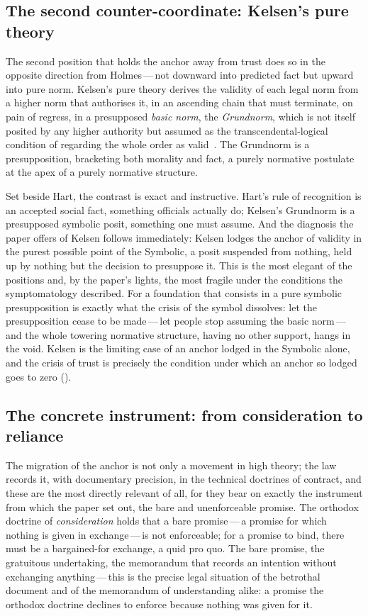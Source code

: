 \subsection{The second counter-coordinate: Kelsen's pure theory}
\label{p13:sub:jur-kelsen}

The second position that holds the anchor away from trust does so in the opposite direction from Holmes\,---\,not downward into predicted fact but upward into pure norm. Kelsen's pure theory derives the validity of each legal norm from a higher norm that authorises it, in an ascending chain that must terminate, on pain of regress, in a presupposed \emph{basic norm}, the \emph{Grundnorm}, which is not itself posited by any higher authority but assumed as the transcendental-logical condition of regarding the whole order as valid~\parencite{kelsen1967}. The Grundnorm is a presupposition, bracketing both morality and fact, a purely normative postulate at the apex of a purely normative structure.

Set beside Hart, the contrast is exact and instructive. Hart's rule of recognition is an accepted social fact, something officials actually do; Kelsen's Grundnorm is a presupposed symbolic posit, something one must assume. And the diagnosis the paper offers of Kelsen follows immediately: Kelsen lodges the anchor of validity in the purest possible point of the Symbolic, a posit suspended from nothing, held up by nothing but the decision to presuppose it. This is the most elegant of the positions and, by the paper's lights, the most fragile under the conditions the symptomatology described. For a foundation that consists in a pure symbolic presupposition is exactly what the crisis of the symbol dissolves: let the presupposition cease to be made\,---\,let people stop assuming the basic norm\,---\,and the whole towering normative structure, having no other support, hangs in the void. Kelsen is the limiting case of an anchor lodged in the Symbolic alone, and the crisis of trust is precisely the condition under which an anchor so lodged goes to zero ().

\subsection{The concrete instrument: from consideration to reliance}
\label{p13:sub:jur-estoppel}

The migration of the anchor is not only a movement in high theory; the law records it, with documentary precision, in the technical doctrines of contract, and these are the most directly relevant of all, for they bear on exactly the instrument from which the paper set out, the bare and unenforceable promise. The orthodox doctrine of \emph{consideration} holds that a bare promise\,---\,a promise for which nothing is given in exchange\,---\,is not enforceable; for a promise to bind, there must be a bargained-for exchange, a quid pro quo. The bare promise, the gratuitous undertaking, the memorandum that records an intention without exchanging anything\,---\,this is the precise legal situation of the betrothal document and of the memorandum of understanding alike: a promise the orthodox doctrine declines to enforce because nothing was given for it.


